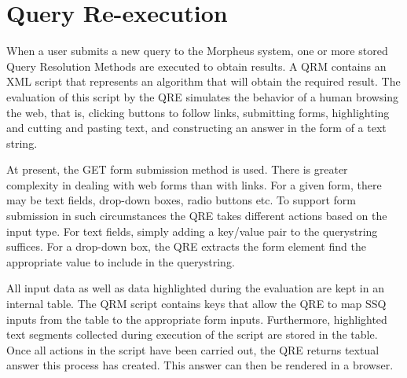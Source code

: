 \section{Query Re-execution}
When a user submits a new query to the Morpheus system, one or more
stored Query Resolution Methods are executed to obtain results. A QRM
contains an XML script that represents an algorithm that will obtain
the required result.  The evaluation of this script by the QRE
simulates the behavior of a human browsing the web, that is, clicking
buttons to follow links, submitting forms, highlighting and cutting
and pasting text, and constructing an answer in the form of a text
string.

At present, the GET form submission method is used.  There is greater
complexity in dealing with web forms than with links. For a given
form, there may be text fields, drop-down boxes, radio buttons etc.
To support form submission in such circumstances the QRE takes
different actions based on the input type. For text fields, simply
adding a key/value pair to the querystring suffices. For a drop-down
box, the QRE extracts the form element find the appropriate value to
include in the querystring.

All input data as well as data highlighted during the evaluation are
kept in an internal table. The QRM script contains keys that allow the
QRE to map SSQ inputs from the table to the appropriate form
inputs. Furthermore, highlighted text segments collected during
execution of the script are stored in the table.  Once all actions in
the script have been carried out, the QRE returns textual answer this
process has created. This answer can then be rendered in a
browser.
